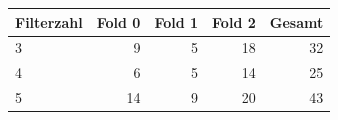 \begin{tabular}{lrrrr}
\toprule
Filterzahl & Fold 0 & Fold 1 & Fold 2 & Gesamt \\
\midrule
3 & 9 & 5 & 18 & 32 \\
4 & 6 & 5 & 14 & 25 \\
5 & 14 & 9 & 20 & 43 \\
\bottomrule
\end{tabular}
